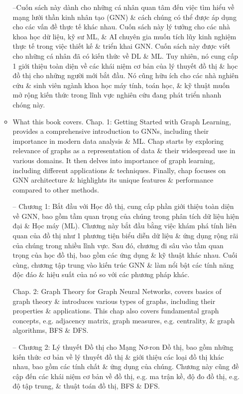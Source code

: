 \documentclass{article}
\begin{document}
\begin{itemize}
\begin{itemize}
        --Cuốn sách này dành cho những cá nhân quan tâm đến việc tìm hiểu về mạng lưới thần kinh nhân tạo (GNN) \& cách chúng có thể được áp dụng cho các vấn đề thực tế khác nhau. Cuốn sách này lý tưởng cho các nhà khoa học dữ liệu, kỹ sư ML, \& AI chuyên gia muốn tích lũy kinh nghiệm thực tế trong việc thiết kế \& triển khai GNN. Cuốn sách này được viết cho những cá nhân đã có kiến thức về DL \& ML. Tuy nhiên, nó cung cấp 1 giới thiệu toàn diện về các khái niệm cơ bản của lý thuyết đồ thị \& học đồ thị cho những người mới bắt đầu. Nó cũng hữu ích cho các nhà nghiên cứu \& sinh viên ngành khoa học máy tính, toán học, \& kỹ thuật muốn mở rộng kiến thức trong lĩnh vực nghiên cứu đang phát triển nhanh chóng này.
        \item {\sf What this book covers.} Chap. 1: Getting Started with Graph Learning, provides a comprehensive introduction to GNNs, including their importance in modern data analysis \& ML. Chap starts by exploring relevance of graphs as a representation of data \& their widespread use in various domains. It then delves into importance of graph learning, including different applications \& techniques. Finally, chap focuses on GNN architecture \& highlights its unique features \& performance compared to other methods.

        -- Chương 1: Bắt đầu với Học đồ thị, cung cấp phần giới thiệu toàn diện về GNN, bao gồm tầm quan trọng của chúng trong phân tích dữ liệu hiện đại \& Học máy (ML). Chương này bắt đầu bằng việc khám phá tính liên quan của đồ thị như 1 phương tiện biểu diễn dữ liệu \& ứng dụng rộng rãi của chúng trong nhiều lĩnh vực. Sau đó, chương đi sâu vào tầm quan trọng của học đồ thị, bao gồm các ứng dụng \& kỹ thuật khác nhau. Cuối cùng, chương tập trung vào kiến trúc GNN \& làm nổi bật các tính năng độc đáo \& hiệu suất của nó so với các phương pháp khác.

        Chap. 2: Graph Theory for Graph Neural Networks, covers basics of graph theory \& introduces various types of graphs, including their properties \& applications. This chap also covers fundamental graph concepts, e.g. adjacency matrix, graph measures, e.g. centrality, \& graph algorithms, BFS \& DFS.

        -- Chương 2: Lý thuyết Đồ thị cho Mạng Nơ-ron Đồ thị, bao gồm những kiến thức cơ bản về lý thuyết đồ thị \& giới thiệu các loại đồ thị khác nhau, bao gồm các tính chất \& ứng dụng của chúng. Chương này cũng đề cập đến các khái niệm cơ bản về đồ thị, e.g. ma trận kề, độ đo đồ thị, e.g. độ tập trung, \& thuật toán đồ thị, BFS \& DFS.


\end{itemize}
\end{itemize}
\end{document}
